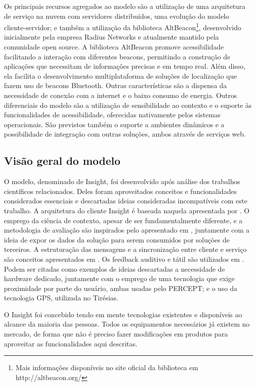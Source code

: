 \documentclass[twoside,english,brazilian]{UNISINOSartigo}
\begin{document}
Os principais recursos agregados ao modelo são a utilização de uma arquitetura de serviço na nuvem com servidores distribuídos, uma evolução do modelo cliente-servidor; e também a utilização da biblioteca AltBeacon\footnote{Mais informações disponíveis no site oficial da biblioteca em http://altbeacon.org/}, desenvolvido inicialmente pela empresa Radius Networks e atualmente mantido pela comunidade open source. A biblioteca AltBeacon promove acessibilidade facilitando a interação com diferentes beacons, permitindo a construção de aplicações que necessitam de informações precisas e em tempo real. Além disso, ela facilita o desenvolvimento multiplataforma de soluções de localização que fazem uso de beacons Bluetooth. Outras características são a dispensa da necessidade de conexão com a internet e o baixo consumo de energia. Outros diferenciais do modelo são a utilização de sensibilidade ao contexto e o suporte às funcionalidades de acessibilidade, oferecidas nativamente pelos sistemas operacionais.
São previstos também o suporte a ambientes dinâmicos e a possibilidade de integração com outras soluções, ambos através de serviços web.

\subsection{Visão geral do modelo}
O modelo, denominado de Insight, foi desenvolvido após análise dos trabalhos científicos relacionados. Deles foram aproveitados conceitos e funcionalidades considerados essenciais e descartadas ideias consideradas incompatíveis com este trabalho. A arquitetura do cliente Insight é baseada naquela apresentada por . O emprego da ciência de contexto, apesar de ser fundamentalmente diferente, e a metodologia de avaliação são inspirados pelo apresentado em , juntamente com a ideia de expor os dados da solução para serem consumidos por soluções de terceiros. A estruturação das mensagens e a sincronização entre cliente e serviço são conceitos apresentados em . Os feedback auditivo e tátil são utilizados em . Podem ser citadas como exemplos de ideias descartadas a necessidade de hardware dedicado, juntamente com o emprego de uma tecnologia que exige proximidade por parte do usuário, ambas usadas pelo PERCEPT; e o uso da tecnologia GPS, utilizada no Tirésias.

O Insight foi concebido tendo em mente tecnologias existentes e disponíveis ao alcance da maioria das pessoas. Todos os equipamentos necessários já existem no mercado, de forma que não é preciso fazer modificações em produtos para aproveitar as funcionalidades aqui descritas.
\end{document}
